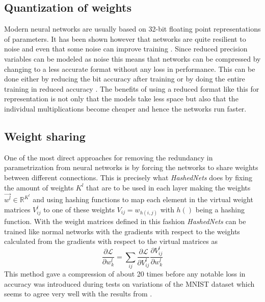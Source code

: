 \documentclass{kththesis}
\newcommand{\bibentry}[1]{\parencite{#1}}
\begin{document}
\subsection{Quantization of weights}
Modern neural networks are usually based on 32-bit floating point representations of parameters. It has been shown however that networks are quite resilient to noise and even that some noise can improve training \bibentry{murray1994enhanced}. Since reduced precision variables can be modeled as noise this means that networks can be compressed by changing to a less accurate format without any loss in performance. This can be done either by reducing the bit accuracy after training \bibentry{vanhoucke2011improving}  or by doing the entire training in reduced accuracy \bibentry{hubara2016quantized} \bibentry{gupta2015deep}. The benefits of using a reduced format like this for representation is not only that the models take less space but also that the individual multiplications become cheaper and hence the networks run faster.

\subsection{Weight sharing}
One of the most direct approaches for removing the redundancy in parametrization from neural networks is by forcing the networks to share weights between different connections. This is precisely what \emph{HashedNets} \bibentry{chen2015compressing} does by fixing the amount of weights \(K^l\) that are to be used in each layer making the weights \(\vec{w^l} \in \mathbb{R}^{K^l}\) and using hashing functions to map each element in the virtual weight matrices \(V_{ij}^l\) to one of these weights \(V_{ij} = w_{h(i,j)}\) with \(h()\) being a hashing function. With the weight matrices defined in this fashion \emph{HashedNets} can be trained like normal networks with the gradients with respect to the weights calculated from the gradients with respect to the virtual matrices as 
\[ \frac{\partial\mathcal{L}}{\partial w_k^l} = \sum_{ij} \frac{\partial\mathcal{L}}{\partial V_{ij}^l}\frac{\partial V_{ij}^l}{\partial w_k^l} \]
This method gave a compression of about 20 times before any notable loss in accuracy was introduced during tests on variations of the MNIST dataset which seems to agree very well with the results from \bibentry{denil2013predicting}.
\end{document}
